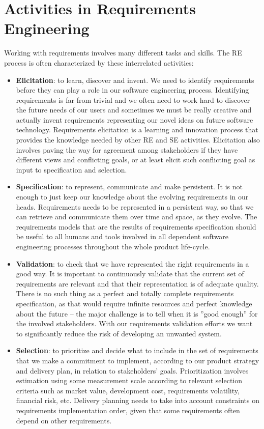 \section*{Activities in Requirements Engineering}

Working with requirements involves many different tasks and skills. The RE process is often characterized by these interrelated activities: 

\begin{itemize}
  \item \textbf{Elicitation}: to learn, discover and invent. We need to identify requirements before they can play a role in our software engineering process. Identifying requirements is far from trivial and we often need to work hard to discover the future needs of our users and sometimes we must be really creative and actually invent requirements representing our novel ideas on future software technology. Requirements elicitation is a learning and innovation process that provides the knowledge needed by other RE and SE activities. Elicitation also involves paving the way for agreement among stakeholders  if they have different views and conflicting goals, or at least elicit such conflicting goal as input to specification and selection.
  \item \textbf{Specification}: to represent, communicate and make persistent. It is not enough to just keep our knowledge about the evolving requirements in our heads. Requirements needs to be represented in a persistent way, so that we can retrieve and communicate them over time and space, as they evolve. The requirements models that are the results of requirements specification should be useful to all humans and tools involved in all dependent software engineering processes throughout the whole product life-cycle.
  \item \textbf{Validation}: to check that we have represented the right requirements in a good way. It is important to continuously validate that the current set of requirements are relevant and that their representation is of adequate quality. There is no such thing as a perfect and totally complete requirements specification, as that would require infinite resources and perfect knowledge about the future -- the major challenge is to tell when it is ''good enough'' for the involved stakeholders. With our requirements validation efforts we want to significantly reduce the risk of developing an unwanted system.
  \item \textbf{Selection}: to prioritize and decide what to include in the set of requirements that we make a commitment to implement, according to our product strategy and delivery plan, in relation to stakeholders' goals. Prioritization involves estimation using some measurement scale according to relevant selection criteria such as market value, development cost, requirements volatility, financial risk, etc. Delivery planning needs to take into account constraints on requirements implementation order, given that some requirements often depend on other requirements. 
\end{itemize}


